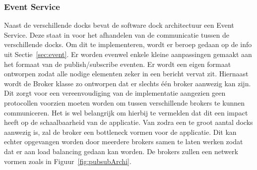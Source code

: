 \subsubsection{Event Service}
Naast de verschillende docks bevat de software dock architectuur een Event Service.
Deze staat in voor het afhandelen van de communicatie tussen de verschillende docks.
Om dit te implementeren, wordt er beroep gedaan op de info uit Sectie~\ref{sec:event}.
Er worden evenwel enkele kleine aanpassingen gemaakt aan het formaat van de publish/subscribe eventen.
Er wordt een eigen formaat ontworpen zodat alle nodige elementen zeker in een bericht vervat zit.
Hiernaast wordt de Broker klasse zo ontworpen dat er slechts één broker aanwezig kan zijn.
Dit zorgt voor een vereenvoudiging van de implementatie aangezien geen protocollen voorzien moeten worden om tussen verschillende brokers te kunnen communiceren.
Het is wel belangrijk om hierbij te vermelden dat dit een impact heeft op de schaalbaarheid van de applicatie.
Van zodra een te groot aantal docks aanwezig is, zal de broker een bottleneck vormen voor de applicatie.
Dit kan echter opgevangen worden door meerdere brokers samen te laten werken zodat dat er aan load balancing gedaan kan worden.
De brokers zullen een netwerk vormen zoals in Figuur~\ref{fig:pubsubArchi}.

